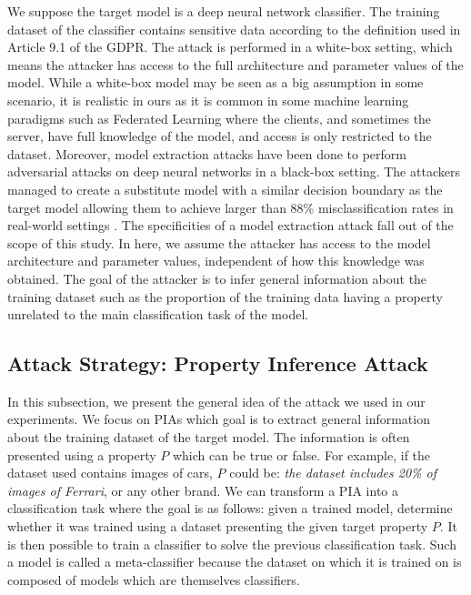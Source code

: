 \documentclass[11pt]{article}
\begin{document}
We suppose the target model is a deep neural network classifier. The training dataset of the classifier contains sensitive data according to the definition used in Article 9.1 of the GDPR. The attack is performed in a white-box setting, which means the attacker has access to the full architecture and parameter values of the model. While a white-box model may be seen as a big assumption in some scenario, it is realistic in ours as it is common in some machine learning paradigms such as Federated Learning \cite{shokri2015privacy} where the clients, and sometimes the server, have full knowledge of the model, and access is only restricted to the dataset. Moreover, model extraction attacks have been done to perform adversarial attacks on deep neural networks in a black-box setting. The attackers managed to create a substitute model with a similar decision boundary as the target model allowing them to achieve larger than 88\% misclassification rates in real-world settings \cite{DBLP:journals/corr/PapernotMGJCS16}. The specificities of a model extraction attack fall out of the scope of this study. In here, we assume the attacker has access to the model architecture and parameter values, independent of how this knowledge was obtained. The goal of the attacker is to infer general information about the training dataset such as the proportion of the training data having a property unrelated to the main classification task of the model.

\subsection{Attack Strategy: Property Inference Attack}
In this subsection, we present the general idea of the attack we used in our experiments. We focus on PIAs which goal is to extract general information about the training dataset of the target model. The information is often presented using a property $P$ which can be true or false. For example, if the dataset used contains images of cars, $P$ could be: \textit{the dataset includes 20\% of images of Ferrari}, or any other brand. We can transform a PIA into a classification task where the goal is as follows: given a trained model, determine whether it was trained using a dataset presenting the given target property $P$. It is then possible to train a classifier to solve the previous classification task. Such a model is called a meta-classifier because the dataset on which it is trained on is composed of models which are themselves classifiers.
\end{document}
